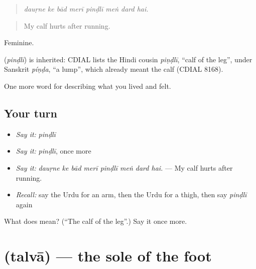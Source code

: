\begin{quote}
       
\end{quote}

\begin{quote}
\emph{dauṛne ke bād merī pinḍlī meṅ dard hai.}
\end{quote}

\begin{quote}
My calf hurts after running.
\end{quote}

Feminine.

\begin{cousinweb}
\textbf{} (\emph{pinḍlī}) is inherited: CDIAL lists the Hindi cousin \emph{piṇḍlī}, \textquotedblleft{}calf of the leg\textquotedblright{}, under Sanskrit \emph{píṇḍa}, \textquotedblleft{}a lump\textquotedblright{}, which already meant the calf (CDIAL 8168).
\end{cousinweb}

\begin{grammarlens}[title={What you've built}]
One more word for describing what you lived and felt.
\end{grammarlens}

\subsection*{Your turn}
\begin{itemize}
\raggedright
  \item \emph{Say it:} \emph{pinḍlī}
  \item \emph{Say it:} \emph{pinḍlī}, once more
  \item \emph{Say it:} \emph{dauṛne ke bād merī pinḍlī meṅ dard hai.} — My calf hurts after running.
  \item \emph{Recall:} say the Urdu for an arm, then the Urdu for a thigh, then say \emph{pinḍlī} again
\end{itemize}

\begin{tcolorbox}[breakable,colback=teal!4,colframe=teal!35!black,title={Before you move on}]
What does  mean? (\textquotedblleft{}The calf of the leg\textquotedblright{}.) Say it once more.
\end{tcolorbox}
\section[\texorpdfstring{\ur{تلوا} (talvā)}{تلوا (talvā)}]{ (talvā) — the sole of the foot}

